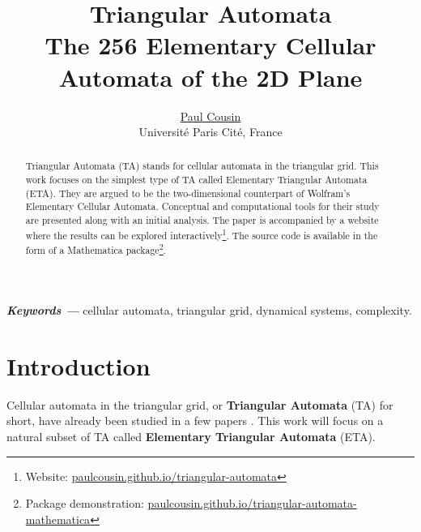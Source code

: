 \documentclass{article}
\providecommand{\keywords}[1]
{
  \small	
  \textbf{\textit{Keywords ---}} #1
}
\begin{document}
\title{\Huge Triangular Automata \\
\Large The 256 Elementary Cellular Automata of the 2D Plane}

\author{\href{https://orcid.org/0000-0002-3866-7615}{Paul Cousin} \\
        \small Université Paris Cité, France
}

\date{}

\maketitle

\begin{abstract}
Triangular Automata (TA) stands for cellular automata in the triangular grid. This work focuses on the simplest type of TA called Elementary Triangular Automata (ETA). They are argued to be the two-dimensional counterpart of Wolfram's Elementary Cellular Automata. Conceptual and computational tools for their study are presented along with an initial analysis. The paper is accompanied by a website where the results can be explored interactively\footnote{Website: \href{https://paulcousin.github.io/triangular-automata}{paulcousin.github.io/triangular-automata}}. The source code is available in the form of a Mathematica package\footnote{Package demonstration: \href{https://paulcousin.github.io/triangular-automata-mathematica}{paulcousin.github.io/triangular-automata-mathematica}}. \smallskip
\end{abstract} 

\keywords{cellular automata, triangular grid, dynamical systems, complexity.}

\section{Introduction} \label{introduction}
Cellular automata in the triangular grid, or \textbf{Triangular Automata} (TA) for short, have already been studied in a few papers \cite{
gerlingClassificationTriangularHoneycomb1990,
baysCellularAutomataTriangular1994,
imaiComputationuniversalTwodimensional8state2000,
naumovGeneralizedCoordinatesCellular2003,
linApplicationUnstructuredCellular2009,
baysCellularAutomataTriangular2009,
baysGameLifeNonsquare2010,
zawidzkiApplicationSemitotalistic2D2011,
brecklingCellularAutomataEcological2011,
saadatCellularAutomataTriangular2016,
ortigozaACFUEGOSUnstructuredTriangular2016,
uguzStructureReversibility2D2017,
saadatCellularAutomataApproach2018,
wainerIntroductionCellularAutomata2019,
pavlovaUsingCellularAutomata2020,
saadatGeneratingPatternsTriangular2021,
saadatCopyMachinesSelfreproduction2023}. This work will focus on a natural subset of TA called \textbf{Elementary Triangular Automata} (ETA). 
\end{document}
